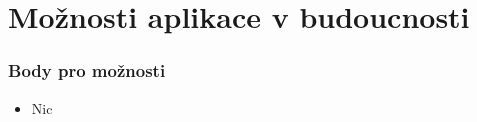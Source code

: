 
\chapter{Možnosti aplikace v budoucnosti}

\subsection{Body pro možnosti}
\begin{itemize}
    \item Nic
\end{itemize}


